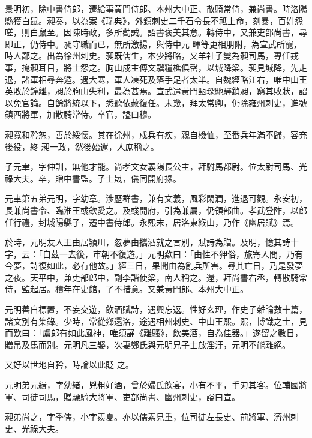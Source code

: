 \begin{pinyinscope}
 景明初，除中書侍郎，遷給事黃門侍郎、本州大中正、散騎常侍，兼尚書。時洛陽縣獲白鼠。昶奏，以為案《瑞典》，外鎮刺史二千石令長不祗上命，刻暴，百姓怨嗟，則白鼠至。因陳時政，多所勸誡。詔書褒美其意。轉侍中，又兼吏部尚書，尋即正，仍侍中。昶守職而已，無所激揚，與侍中元
 暉等更相朋附，為宣武所寵，時人鄙之。出為徐州刺史。昶既儒生，本少將略，又羊社子燮為昶司馬，專任戎事，掩昶耳目，將士怨之。朐山戍主傅文驥糧樵俱罄，以城降梁。昶見城降，先走退，諸軍相尋奔遁。遇大寒，軍人凍死及落手足者太半。自魏經略江右，唯中山王英敗於鐘離，昶於朐山失利，最為甚焉。宣武遣黃門甄琛馳驛鎖昶，窮其敗狀，詔以免官論。自餘將統以下，悉聽依赦復任。未幾，拜太常卿，仍除雍州刺史，進號鎮西將軍，加散騎常侍。卒官，謚曰穆。



 昶寬和矜恕，善於綏懷。其在徐州，戍兵有疾，親自檢恤，至番兵年滿不歸，容充後役，終
 昶一政，然後始還，人庶稱之。



 子元聿，字仲訓，無他才能。尚孝文女義陽長公主，拜駙馬都尉。位太尉司馬、光祿大夫。卒，贈中書監。子士晟，儀同開府掾。



 元聿第五弟元明，字幼章。涉歷群書，兼有文義，風彩閑潤，進退可觀。永安初，長兼尚書令、臨淮王彧欽愛之。及彧開府，引為兼屬，仍領部曲。孝武登阼，以郎任行禮，封城陽縣子，遷中書侍郎。永熙末，居洛東緱山，乃作《幽居賦》焉。



 於時，元明友人王由居潁川，忽夢由攜酒就之言別，賦詩為贈。及明，憶其詩十字，云：「自茲一去後，市朝不復遊。」元明歎曰：「由性不狎俗，旅寄人間，乃有
 今夢，詩復如此，必有他故。」經三日，果聞由為亂兵所害。尋其亡日，乃是發夢之夜。天平中，兼吏部郎中，副李諧使梁，南人稱之。還，拜尚書右丞，轉散騎常侍，監起居。積年在史館，了不措意。又兼黃門郎、本州大中正。



 元明善自標置，不妄交遊，飲酒賦詩，遇興忘返。性好玄理，作史子雜論數十篇，諸文別有集錄。少時，常從鄉還洛，途遇相州刺史、中山王熙。熙，博識之士，見而歎曰：「盧郎有如此風神，唯須誦《離騷》，飲美酒，自為佳器。」遂留之數日，贈帛及馬而別。元明凡三娶，次妻鄭氏與元明兄子士啟淫汙，元明不能離絕。



 又好以世地自矜，時論以此貶
 之。



 元明弟元緝，字幼緒，兇粗好酒，曾於婦氏飲宴，小有不平，手刃其客。位輔國將軍、司徒司馬，贈驃騎大將軍、吏部尚書、幽州刺史，謚曰宣。



 昶弟尚之，字季儒，小字羨夏。亦以儒素見重，位司徒左長史、前將軍、濟州刺史、光祿大夫。




\end{pinyinscope}
